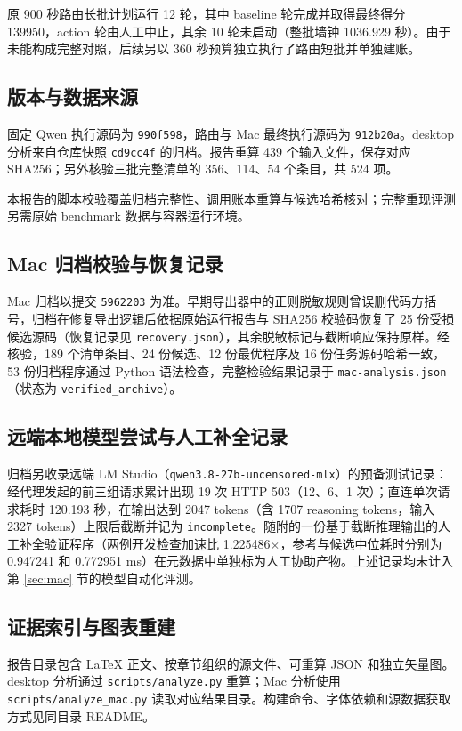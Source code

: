 原 900 秒路由长批计划运行 12 轮，其中 baseline 轮完成并取得最终得分 139950，action 轮由人工中止，其余 10 轮未启动（整批墙钟 1036.929 秒）。由于未能构成完整对照，后续另以 360 秒预算独立执行了路由短批并单独建账。

\subsection{版本与数据来源}
固定 Qwen 执行源码为 \texttt{990f598}，路由与 Mac 最终执行源码为 \texttt{912b20a}。desktop 分析来自仓库快照 \texttt{cd9cc4f} 的归档。报告重算 439 个输入文件，保存对应 SHA256；另外核验三批完整清单的 356、114、54 个条目，共 524 项。

本报告的脚本校验覆盖归档完整性、调用账本重算与候选哈希核对；完整重现评测另需原始 benchmark 数据与容器运行环境。

\subsection{Mac 归档校验与恢复记录}
Mac 归档以提交 \texttt{5962203} 为准。早期导出器中的正则脱敏规则曾误删代码方括号，归档在修复导出逻辑后依据原始运行报告与 SHA256 校验码恢复了 25 份受损候选源码（恢复记录见 \texttt{recovery.json}），其余脱敏标记与截断响应保持原样。经核验，189 个清单条目、24 份候选、12 份最优程序及 16 份任务源码哈希一致，53 份归档程序通过 Python 语法检查，完整检验结果记录于 \texttt{mac-analysis.json}（状态为 \texttt{verified\_archive}）。

\subsection{远端本地模型尝试与人工补全记录}
归档另收录远端 LM Studio（\texttt{qwen3.8-27b-uncensored-mlx}）的预备测试记录：经代理发起的前三组请求累计出现 19 次 HTTP 503（12、6、1 次）；直连单次请求耗时 120.193 秒，在输出达到 2047 tokens（含 1707 reasoning tokens，输入 2327 tokens）上限后截断并记为 \texttt{incomplete}。随附的一份基于截断推理输出的人工补全验证程序（两例开发检查加速比 1.225486$\times$，参考与候选中位耗时分别为 0.947241 和 0.772951 ms）在元数据中单独标为人工协助产物。上述记录均未计入第 \ref{sec:mac} 节的模型自动化评测。

\subsection{证据索引与图表重建}
报告目录包含 LaTeX 正文、按章节组织的源文件、可重算 JSON 和独立矢量图。desktop 分析通过 \texttt{scripts/analyze.py} 重算；Mac 分析使用 \texttt{scripts/analyze\_mac.py} 读取对应结果目录。构建命令、字体依赖和源数据获取方式见同目录 README。

